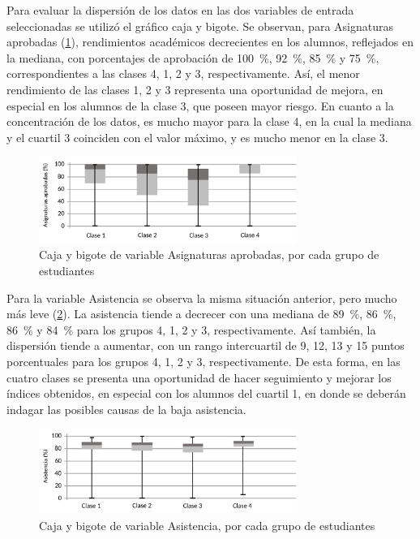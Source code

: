 \documentclass[portuguese]{textolivre}
\begin{document}
Para evaluar la dispersión de los datos en las dos variables de entrada seleccionadas se utilizó el gráfico caja y bigote. Se observan, para Asignaturas aprobadas (\cref{Figura 7}), rendimientos académicos decrecientes en los alumnos, reflejados en la mediana, con porcentajes de aprobación de 100~\%, 92~\%, 85~\% y 75~\%, correspondientes a las clases 4, 1, 2 y 3, respectivamente. Así, el menor rendimiento de las clases 1, 2 y 3 representa una oportunidad de mejora, en especial en los alumnos de la clase 3, que poseen mayor riesgo. En cuanto a la concentración de los datos, es mucho mayor para la clase 4, en la cual la mediana y el cuartil 3 coinciden con el valor máximo, y es mucho menor en la clase 3.

\begin{figure}[htbp]
 \centering
 \includegraphics[width=0.75\textwidth]{images/fig-007.pdf}
 \caption{Caja y bigote de variable Asignaturas aprobadas, por cada grupo de estudiantes}
 \label{Figura 7}
\end{figure}

Para la variable Asistencia se observa la misma situación anterior, pero mucho más leve (\cref{Figura 8}). La asistencia tiende a decrecer con una mediana de 89~\%, 86~\%, 86~\% y 84~\% para los grupos 4, 1, 2 y 3, respectivamente. Así también, la dispersión tiende a aumentar, con un rango intercuartil de 9, 12, 13 y 15 puntos porcentuales para los grupos 4, 1, 2 y 3, respectivamente. De esta forma, en las cuatro clases se presenta una oportunidad de hacer seguimiento y mejorar los índices obtenidos, en especial con los alumnos del cuartil 1, en donde se deberán indagar las posibles causas de la baja asistencia.

\begin{figure}[htbp]
 \centering
 \includegraphics[width=0.75\textwidth]{images/fig-008.pdf}
 \caption{Caja y bigote de variable Asistencia, por cada grupo de estudiantes}
 \label{Figura 8}
\end{figure}
\end{document}
